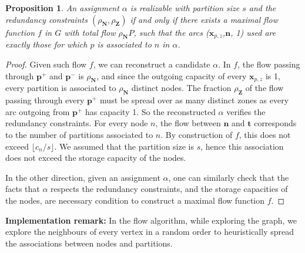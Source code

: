 \documentclass[]{article}
\newtheorem{proposition}{Proposition}
\begin{document}
\begin{proposition}
	An assignment $\alpha$ is realizable with partition size $s$ and the redundancy constraints $(\rho_\mathbf{N},\rho_\mathbf{Z})$ if and only if there exists a maximal flow function $f$ in $G$ with total flow $\rho_\mathbf{N}P$, such that the arcs ($\mathbf{x}_{p,z}$,$\mathbf{n}$, 1) used are exactly those for which $p$ is associated to $n$ in $\alpha$.
\end{proposition}
\begin{proof}
	Given such flow $f$, we can reconstruct a candidate $\alpha$. In $f$, the flow passing through $\mathbf{p^+}$ and $\mathbf{p^-}$ is $\rho_\mathbf{N}$, and since the outgoing capacity of every $\mathbf{x}_{p,z}$ is 1, every partition is associated to $\rho_\mathbf{N}$ distinct nodes. The fraction $\rho_\mathbf{Z}$ of the flow passing through every $\mathbf{p^+}$ must be spread over as many distinct zones as every arc outgoing from $\mathbf{p^+}$ has capacity 1. So the reconstructed $\alpha$ verifies the redundancy constraints. For every node $n$, the flow between $\mathbf{n}$ and $\mathbf{t}$ corresponds to the number of partitions associated to $n$. By construction of $f$, this does not exceed $\lfloor c_n/s \rfloor$. We assumed that the partition size is $s$, hence this association does not exceed the storage capacity of the nodes.
	
	In the other direction, given an assignment $\alpha$, one can similarly check that the facts that $\alpha$ respects the redundancy constraints, and the storage capacities of the nodes, are necessary condition to construct a maximal flow function $f$.
\end{proof}

\textbf{Implementation remark:} In the flow algorithm, while exploring the graph, we explore the neighbours of every vertex in a random order to heuristically spread the associations between nodes and partitions.
\end{document}
